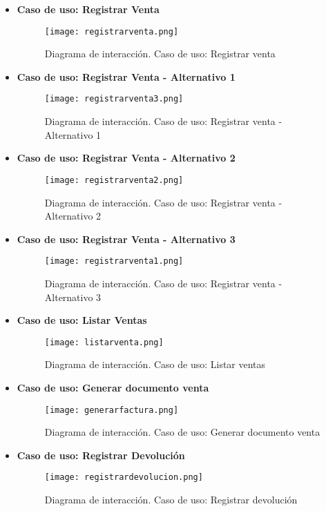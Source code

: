 \begin{itemize}
\item \textbf{Caso de uso: Registrar Venta}
\begin{figure}[!htb]
  \centering
    \texttt{[image: registrarventa.png]}
  \caption{Diagrama de interacción. Caso de uso: Registrar venta}
  \label{a}
\end{figure}
\newpage
\item \textbf{Caso de uso: Registrar Venta - Alternativo 1}
\begin{figure}[!htb]
  \centering
    \texttt{[image: registrarventa3.png]}
  \caption{Diagrama de interacción. Caso de uso: Registrar venta - Alternativo 1}
  \label{a}
\end{figure}
\item \textbf{Caso de uso: Registrar Venta - Alternativo 2}
\begin{figure}[!htb]
  \centering
    \texttt{[image: registrarventa2.png]}
  \caption{Diagrama de interacción. Caso de uso: Registrar venta - Alternativo 2}
  \label{a}
\end{figure}

\newpage
\item \textbf{Caso de uso: Registrar Venta - Alternativo 3}
\begin{figure}[!htb]
  \centering
    \texttt{[image: registrarventa1.png]}
  \caption{Diagrama de interacción. Caso de uso: Registrar venta - Alternativo 3}
  \label{a}
\end{figure}

\newpage
\item \textbf{Caso de uso: Listar Ventas}
\begin{figure}[!htb]
  \centering
    \texttt{[image: listarventa.png]}
  \caption{Diagrama de interacción. Caso de uso: Listar ventas}
  \label{a}
\end{figure}

\item \textbf{Caso de uso: Generar documento venta}
\begin{figure}[!htb]
  \centering
    \texttt{[image: generarfactura.png]}
  \caption{Diagrama de interacción. Caso de uso: Generar documento venta}
  \label{a}
\end{figure}

\newpage
\item \textbf{Caso de uso: Registrar Devolución}
\begin{figure}[!htb]
  \centering
    \texttt{[image: registrardevolucion.png]}
  \caption{Diagrama de interacción. Caso de uso: Registrar devolución}
  \label{a}
\end{figure}


\end{itemize}
